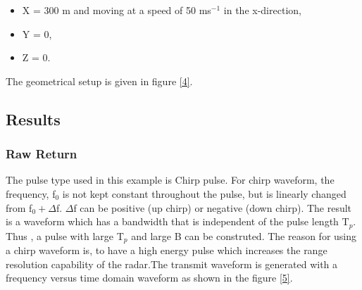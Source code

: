 \documentclass[thmsa,a4paper,ukenglish]{report}
\begin{document}
\begin{itemize}
\begin{itemize}
\item  \smallskip \smallskip X = 300 m and moving at a speed of 50 ms$^{-1}$
in the x-direction,

\item  Y = 0,

\item  Z = 0.
\end{itemize}
\end{itemize}

The geometrical setup is given in figure \ref{4}.


\subsection{Results}

\subsubsection{Raw Return}

\smallskip The pulse type used in this example is Chirp pulse. For chirp
waveform, the frequency, f$_{0}$ is not kept constant throughout the pulse,
but is linearly changed from f$_{0}+\Delta $f. $\Delta $f can be positive
(up chirp) or negative (down chirp). The result is a waveform which has a
bandwidth that is independent of the pulse length T$_{p}$. Thus , a pulse
with large T$_{p}$ and large B can be construted. The reason for using a
chirp waveform is, to have a high energy pulse which increases the range
resolution capability of the radar.The transmit waveform is generated with a
frequency versus time domain waveform as shown in the figure \ref{5}.

\end{document}
